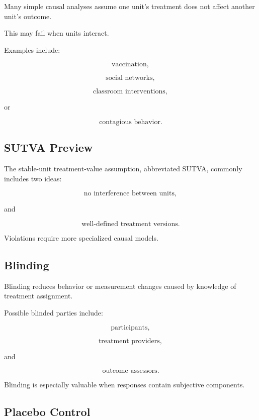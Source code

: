 Many simple causal analyses assume one unit's treatment does not affect
another unit's outcome.

This may fail when units interact.

Examples include:

\[
\boxed{
\text{vaccination},
}
\]

\[
\boxed{
\text{social networks},
}
\]

\[
\boxed{
\text{classroom interventions},
}
\]

or

\[
\boxed{
\text{contagious behavior}.
}
\]

\subsection{SUTVA Preview}
\label{subsec:sutva-preview}

The stable-unit treatment-value assumption, abbreviated SUTVA, commonly
includes two ideas:

\[
\boxed{
\text{no interference between units},
}
\]

and

\[
\boxed{
\text{well-defined treatment versions}.
}
\]

Violations require more specialized causal models.

\subsection{Blinding}
\label{subsec:blinding-design}

Blinding reduces behavior or measurement changes caused by knowledge of
treatment assignment.

Possible blinded parties include:

\[
\boxed{
\text{participants},
}
\]

\[
\boxed{
\text{treatment providers},
}
\]

and

\[
\boxed{
\text{outcome assessors}.
}
\]

Blinding is especially valuable when responses contain subjective
components.

\subsection{Placebo Control}
\label{subsec:placebo-control-design}

